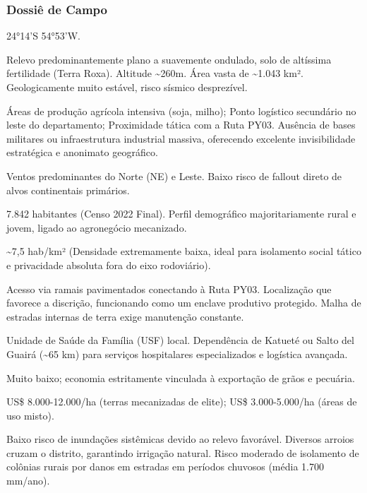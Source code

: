 \subsubsection{Dossiê de Campo}
\begin{description}[style=nextline,leftmargin=0.5cm,font=\bfseries]
\item[Coordenadas]  24°14'S 54°53'W.
\item[Topografia]  Relevo predominantemente plano a suavemente ondulado, solo de altíssima fertilidade (Terra Roxa). Altitude \textasciitilde 260m. Área vasta de \textasciitilde 1.043 km². Geologicamente muito estável, risco sísmico desprezível.
\item[Alvos Estratégicos]  Áreas de produção agrícola intensiva (soja, milho); Ponto logístico secundário no leste do departamento; Proximidade tática com a Ruta PY03. Ausência de bases militares ou infraestrutura industrial massiva, oferecendo excelente invisibilidade estratégica e anonimato geográfico.
\item[Fallout]  Ventos predominantes do Norte (NE) e Leste. Baixo risco de fallout direto de alvos continentais primários.
\item[População]  7.842 habitantes (Censo 2022 Final). Perfil demográfico majoritariamente rural e jovem, ligado ao agronegócio mecanizado.
\item[Densidade]  \textasciitilde 7,5 hab/\allowbreak km² (Densidade extremamente baixa, ideal para isolamento social tático e privacidade absoluta fora do eixo rodoviário).
\item[Vias de Acesso]  Acesso via ramais pavimentados conectando à Ruta PY03. Localização que favorece a discrição, funcionando como um enclave produtivo protegido. Malha de estradas internas de terra exige manutenção constante.
\item[Serviços]  Unidade de Saúde da Família (USF) local. Dependência de Katueté ou Salto del Guairá (\textasciitilde 65 km) para serviços hospitalares especializados e logística avançada.
\item[Custo de Vida]  Muito baixo; economia estritamente vinculada à exportação de grãos e pecuária.
\item[Preço da Terra]  US\$ 8.000-12.000/\allowbreak ha (terras mecanizadas de elite); US\$ 3.000-5.000/\allowbreak ha (áreas de uso misto).
\item[Hidrologia]  Baixo risco de inundações sistêmicas devido ao relevo favorável. Diversos arroios cruzam o distrito, garantindo irrigação natural. Risco moderado de isolamento de colônias rurais por danos em estradas em períodos chuvosos (média 1.700 mm/\allowbreak ano).

\end{description}
